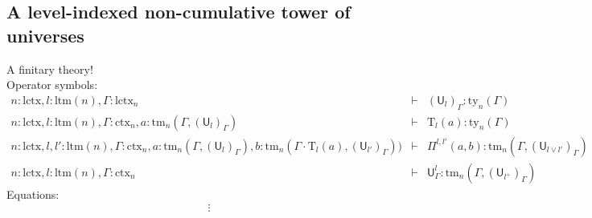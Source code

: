 \documentclass[11pt,a4paper]{article}
\theoremstyle{definition}
\newcommand{\UU}{\mathsf{U}}
\def\UU{\mathsf{U}}
\newcommand{\N}{\mathsf{N}}
\def\Pihat{\Pi}
\def\lctx{\mathrm{lctx}}
\def\ltm{\mathrm{ltm}}
\newcommand{\ctx}{\mathrm{ctx}}
\newcommand{\ty}{\mathrm{ty}}
\newcommand{\tm}{\mathrm{tm}}
\def\U{\mathsf{U}}
\newcommand{\Ta}{\mathrm{T}}
\begin{document}
\subsection{A level-indexed non-cumulative tower of universes}

\begin{tiny}
A finitary theory!
\\
\vspace{1ex}
Operator symbols:
\begin{eqnarray*}
n : \lctx, l : \ltm(n), \Gamma : \lctx_n &\vdash& (\U_{l})_\Gamma : \ty_n(\Gamma)\\
n : \lctx, l : \ltm(n), \Gamma : \ctx_n, a : \tm_n(\Gamma,(\U_{l})_\Gamma) &\vdash& {\Ta_{l}}(a) : \ty_n(\Gamma)\\
n : \lctx, l, l' : \ltm(n), \Gamma : \ctx_n,
a : \tm_n(\Gamma,(\U_{l})_\Gamma),
b :  \tm_n(\Gamma \cdot \Ta_{l}(a), (\U_{l'})_\Gamma))
&\vdash&
 \Pihat^{l,l'}(a,b) : \tm_n(\Gamma,(\U_{l \vee l'})_\Gamma)\\
 n : \lctx, l : \ltm(n),\Gamma : \ctx_n&\vdash&\UU^l_\Gamma: \tm_n(\Gamma,(\UU_{l^+})_\Gamma)
\end{eqnarray*}
Equations:
\begin{eqnarray*}
&\vdots&
\end{eqnarray*}

\end{tiny}
\end{document}
